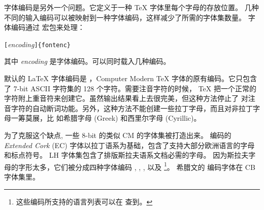 字体编码是另外一个问题。它定义于一种 \TeX{} 字体里每个字母的存放位置。
几种不同的输入编码可以被映射到一种字体编码，这样减少了所需的字体集数量。
字体编码通过  宏包来处理：\label{fontenc}
\begin{lscommand}
\verb|[|\emph{encoding}\verb|]{fontenc}| 
\end{lscommand}
\noindent 其中 \emph{encoding} 是字体编码。可以同时载入几种编码。

默认的 \LaTeX{} 字体编码是 \label{OT1}，Computer Modern
\TeX{} 字体的原有编码。它只包含了 7-bit ASCII 字符集的 128 个字符。需要注音字符的时候，
\TeX{} 把一个正常的字符附上重音符来创建它。虽然输出结果看上去很完美，但这种方法停止了
对注音字符的自动断词功能。另外，这种方法不能创建一些拉丁字母，而且对非拉丁字母一筹莫展，比
如希腊字母 (Greek) 和西里尔字母 (Cyrillic)。

为了克服这个缺点, 一些 8-bit 的类似 CM 的字体集被打造出来。
 编码的 \emph{Extended
Cork} (EC) 字体以拉丁语系为基础，包含了支持大部分欧洲语言的字母和标点符号。
LH 字体集包含了排版斯拉夫语系文档必需的字母。
因为斯拉夫字母的字形太多，它们被分成四种字体编码 \pozhehao {},
, ,
以及 \footnote{这些编码所支持的语言列表可以在 \cite{cyrguide} 查到。}。
希腊文的  编码字体在 CB 字体集里。

